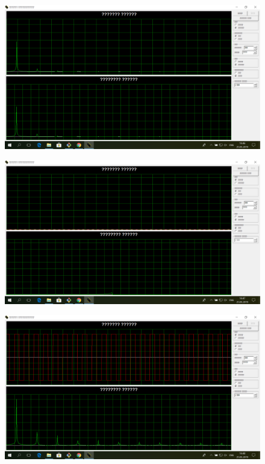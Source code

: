 \begin{figure}[H]
	\centering
	\includegraphics[width=\textwidth]{img/3.png}
	\caption{}
\end{figure}

\begin{figure}[H]
	\centering
	\includegraphics[width=\textwidth]{img/4.png}
	\caption{}
\end{figure}

\begin{figure}[H]
	\centering
	\includegraphics[width=\textwidth]{img/5.png}
	\caption{}
\end{figure}

